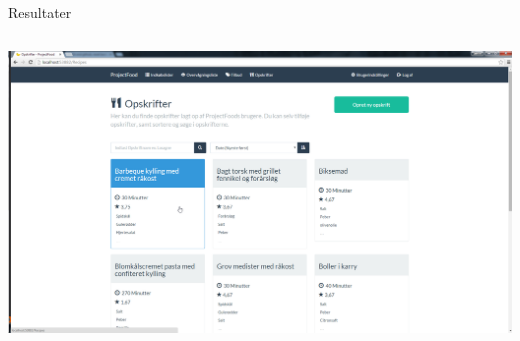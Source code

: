 \begin{frame}{Resultater}
\begin{minipage}[0.3\textheight]{\textwidth}
\begin{columns}[T]
\begin{column}{0.5\textwidth}
	  \includegraphics[width=1\textwidth,height=1\textheight,keepaspectratio, trim={1cm 0 0 16mm}, clip]{images/Screenshots//Recipe.png}
	\end{column}
	\end{columns}
	

  \end{minipage}
  
  	
\end{frame}

